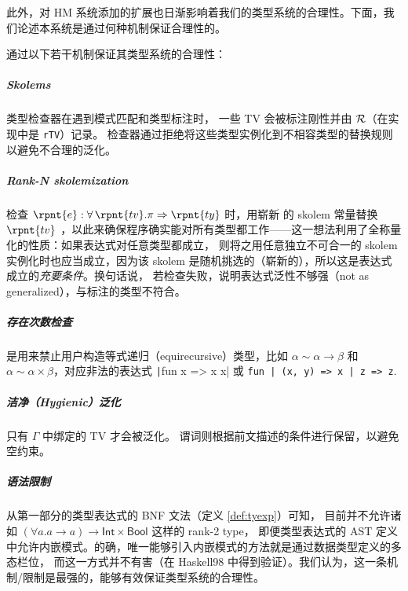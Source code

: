 此外，对 HM 系统添加的扩展也日渐影响着我们的类型系统的合理性。下面，我们论述本系统是通过何种机制保证合理性的。

\begin{property}
  \Tigris 通过以下若干机制保证其类型系统的合理性：
  {\setlength{\parskip}{-1em}
    \subparagraph*{Skolems} 类型检查器在遇到模式匹配和类型标注时，
    一些 TV 会被标注刚性并由 $\mathcal{R}$（在实现中是 \texttt{rTV}）记录。
    检查器通过拒绝将这些类型实例化到不相容类型的替换规则以避免不合理的泛化。
    \subparagraph*{Rank-N skolemization} 检查 \(\rpnt{e} : \forall \, \rpnt{tv} . \pi \Rightarrow \rpnt{ty}\) 时，用崭新
    的 skolem 常量替换 \(\rpnt{tv}\) ，以此来确保程序确实能对所有类型都工作——这一想法利用了全称量化的性质：如果表达式对任意类型都成立，
    则将之用任意独立不可合一的 skolem 实例化时也应当成立，因为该 skolem 是随机挑选的（崭新的），所以这是表达式成立的\emph{充要条件}。换句话说，
    若检查失败，说明表达式泛性不够强（not as generalized），与标注的类型不符合。
  }
  {\setlength{\parskip}{-1em}
    \subparagraph*{存在次数检查} 是用来禁止用户构造等式递归（equirecursive）类型，比如
    \(\alpha \sim \alpha\to \beta\) 和 \(\alpha \sim \alpha\times\beta\)，对应非法的表达式
    \texttt|fun x => x x| 或
    \texttt{fun | (x, y) => x | z => z}.
    \subparagraph*{洁净（Hygienic）泛化} 只有 $\Gamma$ 中绑定的 TV 才会被泛化。
    谓词则根据前文描述的条件进行保留，以避免空约束。
  }
  \subparagraph*{语法限制} 从第一部分的类型表达式的 BNF 文法（定义 \ref{def:tyexp}）可知，
  目前并不允许诸如 \((\forall a. a\to a)\to\mathsf{Int}\times \mathsf{Bool}\) 这样的 rank-2 type，
  即便类型表达式的 AST 定义中允许内嵌模式。的确，唯一能够引入内嵌模式的方法就是通过数据类型定义的多态栏位，
  而这一方式并不有害（在 Haskell98 中得到验证）。我们认为，这一条机制/限制是最强的，能够有效保证类型系统的合理性。
\end{property}


